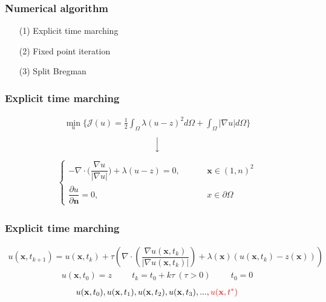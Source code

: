 \documentclass[xcolor=dvipsnames, xetex,serif]{beamer}
\begin{document}
    \begin{frame}
        \frametitle{Numerical algorithm}
        \begin{itemize}
            \item[(1)] Explicit time marching
            \item[(2)] Fixed point iteration
            \item[(3)] Split Bregman
        \end{itemize}
    \end{frame}
    \begin{frame}
		\frametitle{Explicit time marching}
		\begin{align*}
		\min_{u} \{ \mathcal{J}(u) = \frac{1}{2} \int_{\Omega}\lambda (u-z)^2 d\Omega +  \int_{\Omega}  |\nabla u|  d\Omega \}
		\end{align*}
		$$ \Big \downarrow$$
		\begin{align*}
		\left \{ \begin{array}{ll}  - \nabla \cdot  \Big( \dfrac{\nabla u}{|\nabla u|} \Big) + \lambda (u-z) = 0,  & \hspace{1cm} \mathbf{x} \in (1,n)^2 \\ \dfrac{\partial u}{\partial \boldsymbol{n}} = 0, & \hspace{1cm} x \in \partial \Omega \end{array} \right .
        \end{align*}
        \let\thefootnote\relax{}						
    \end{frame} 
    \begin{frame}
        \frametitle{Explicit time marching}
        \begin{align*}
        u(\mathbf{x},t_{k+1})=u(\mathbf{x},t_{k})+\tau\left(\nabla \cdot\left(\dfrac{\nabla u (\mathbf{x},t_k)}{| \nabla u (\mathbf{x},t_k) | }\right) + \lambda(\mathbf{x})(u (\mathbf{x},t_k)-z(\mathbf{x})) \right)
        \end{align*}
        \begin{align*}
        u(\mathbf{x},t_0)=z \hspace{1cm} t_k=t_0+k\tau\ (\tau>0)  \hspace{1cm}  t_0=0
        \end{align*}
        \vspace{1cm}
        \begin{align*}
            u(\mathbf{x},t_0), u(\mathbf{x},t_1), u(\mathbf{x},t_2), u(\mathbf{x},t_3), ... ,  \textcolor{red}{u(\mathbf{x},t^{*})}
        \end{align*}
    \end{frame} 
\end{document}
